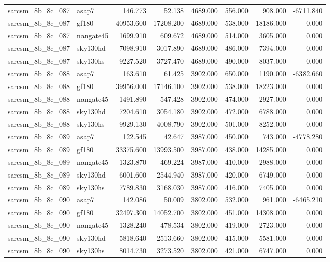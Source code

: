 \begin{tabular}{llrrrrrr}
sarcsm\_8b\_8c\_087 & asap7 & 146.773 & 52.138 & 4689.000 & 556.000 & 908.000 & -6711.840 \\
sarcsm\_8b\_8c\_087 & gf180 & 40953.600 & 17208.200 & 4689.000 & 538.000 & 18186.000 & 0.000 \\
sarcsm\_8b\_8c\_087 & nangate45 & 1699.910 & 609.672 & 4689.000 & 514.000 & 3605.000 & 0.000 \\
sarcsm\_8b\_8c\_087 & sky130hd & 7098.910 & 3017.890 & 4689.000 & 486.000 & 7394.000 & 0.000 \\
sarcsm\_8b\_8c\_087 & sky130hs & 9227.520 & 3727.470 & 4689.000 & 490.000 & 8037.000 & 0.000 \\
sarcsm\_8b\_8c\_088 & asap7 & 163.610 & 61.425 & 3902.000 & 650.000 & 1190.000 & -6382.660 \\
sarcsm\_8b\_8c\_088 & gf180 & 39956.000 & 17146.100 & 3902.000 & 538.000 & 18223.000 & 0.000 \\
sarcsm\_8b\_8c\_088 & nangate45 & 1491.890 & 547.428 & 3902.000 & 474.000 & 2927.000 & 0.000 \\
sarcsm\_8b\_8c\_088 & sky130hd & 7204.610 & 3054.180 & 3902.000 & 472.000 & 6788.000 & 0.000 \\
sarcsm\_8b\_8c\_088 & sky130hs & 9929.130 & 4008.790 & 3902.000 & 501.000 & 8252.000 & 0.000 \\
sarcsm\_8b\_8c\_089 & asap7 & 122.545 & 42.647 & 3987.000 & 450.000 & 743.000 & -4778.280 \\
sarcsm\_8b\_8c\_089 & gf180 & 33375.600 & 13993.500 & 3987.000 & 438.000 & 14285.000 & 0.000 \\
sarcsm\_8b\_8c\_089 & nangate45 & 1323.870 & 469.224 & 3987.000 & 410.000 & 2988.000 & 0.000 \\
sarcsm\_8b\_8c\_089 & sky130hd & 6001.600 & 2544.940 & 3987.000 & 420.000 & 6749.000 & 0.000 \\
sarcsm\_8b\_8c\_089 & sky130hs & 7789.830 & 3168.030 & 3987.000 & 416.000 & 7405.000 & 0.000 \\
sarcsm\_8b\_8c\_090 & asap7 & 142.086 & 50.009 & 3802.000 & 532.000 & 961.000 & -6465.210 \\
sarcsm\_8b\_8c\_090 & gf180 & 32497.300 & 14052.700 & 3802.000 & 451.000 & 14308.000 & 0.000 \\
sarcsm\_8b\_8c\_090 & nangate45 & 1328.240 & 478.534 & 3802.000 & 419.000 & 2723.000 & 0.000 \\
sarcsm\_8b\_8c\_090 & sky130hd & 5818.640 & 2513.660 & 3802.000 & 415.000 & 5581.000 & 0.000 \\
sarcsm\_8b\_8c\_090 & sky130hs & 8014.730 & 3273.520 & 3802.000 & 421.000 & 6747.000 & 0.000 \\

\end{tabular}
